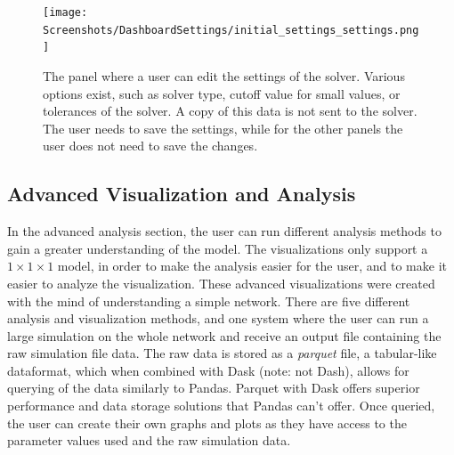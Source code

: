 \begin{figure}
    \centering
    \texttt{[image: Screenshots/DashboardSettings/initial\_settings\_settings.png]}
    \caption{
        The panel where a user can edit the settings of the solver. 
        Various options exist, such as solver type, cutoff value for small values, or tolerances of the solver. 
        A copy of this data is not sent to the solver. 
        The user needs to save the settings, while for the other panels the user does not need to save the changes. 
    }
    \label{fig:ss:ds:settings}
\end{figure}

\subsection{Advanced Visualization and Analysis}
In the advanced analysis section, the user can run different analysis methods to gain a greater understanding of the model. 
The visualizations only support a $1 \times 1\times 1$ model, in order to make the analysis easier for the user, and to make it easier to analyze the visualization. 
These advanced visualizations were created with the mind of understanding a simple network. 
There are five different analysis and visualization methods, and one system where the user can run a large simulation on the whole network and receive an output file containing the raw simulation file data. 
The raw data is stored as a \textit{parquet} file, a tabular-like dataformat, which when combined with Dask (note: not Dash), allows for querying of the data similarly to Pandas. 
Parquet with Dask offers superior performance and data storage solutions that Pandas can't offer. 
Once queried, the user can create their own graphs and plots as they have access to the parameter values used and the raw simulation data. 
